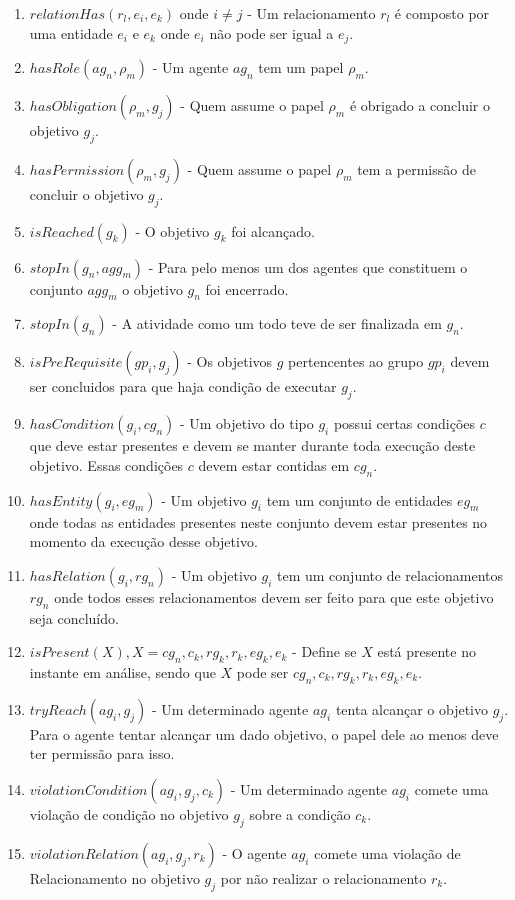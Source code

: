 \documentclass[12pt]{article}
\begin{document}
\begin{enumerate}
	\item $relationHas(r_l,e_i,e_k)$ onde $i \neq j$ - Um relacionamento $r_l$ é composto por uma entidade $e_i$ e $e_k$ onde $e_i$ não pode ser igual a $e_j$.	
	\item $hasRole(ag_n,\rho_m)$ - Um agente $ag_n$ tem um papel $\rho_m$.
	\item $hasObligation(\rho_m,g_j)$ - Quem assume o papel $\rho_m$ é obrigado a concluir o objetivo $g_j$.
	\item $hasPermission(\rho_m,g_j)$ - Quem assume o papel $\rho_m$ tem a permissão de concluir o objetivo $g_j$.
	\item $isReached(g_k)$ - O objetivo $g_k$ foi alcançado.
	\item $stopIn(g_n,agg_m)$ - Para pelo menos um dos agentes que constituem o conjunto $agg_m$ o objetivo $g_n$ foi encerrado. 	 				
	\item $stopIn(g_n)$ - A atividade como um todo teve de ser finalizada em $g_n$.	 			
	\item $isPreRequisite(gp_i,g_j)$ - Os objetivos $g$ pertencentes ao grupo $gp_i$ devem ser concluidos para que haja condição de executar $g_j$.
	\item $hasCondition(g_i,cg_n)$ - Um objetivo do tipo $g_i$ possui certas condições $c$ que deve estar presentes e devem se manter durante toda execução deste objetivo. Essas condições $c$ devem estar contidas em $cg_n$. 
	\item $hasEntity(g_i,eg_m)$ - Um objetivo $g_i$ tem um conjunto de entidades $eg_m$ onde todas as entidades presentes neste conjunto devem estar presentes no momento da execução desse objetivo.
	\item $hasRelation(g_i,rg_n)$ - Um objetivo $g_i$ tem um conjunto de relacionamentos $rg_n$ onde todos esses relacionamentos devem ser feito para que este objetivo seja concluído.
	\item $isPresent(X), X = cg_n,c_k,rg_k,r_k,eg_k,e_k$ - Define se $X$ está presente no instante em análise, sendo que $X$ pode ser $cg_n,c_k,rg_k,r_k,eg_k,e_k$.
	\item $tryReach(ag_i,g_j)$ - Um determinado agente $ag_i$ tenta alcançar o objetivo $g_j$. Para o agente tentar alcançar um dado objetivo, o papel dele ao menos deve ter permissão para isso.  
	\item $violationCondition(ag_i,g_j,c_k)$ - Um determinado agente $ag_i$ comete uma violação de condição no objetivo $g_j$ sobre a condição $c_k$. 
	\item $violationRelation(ag_i,g_j,r_k)$ - O agente $ag_i$ comete uma violação de Relacionamento no objetivo $g_j$ por não realizar o relacionamento $r_k$. 

\end{enumerate}
\end{document}

